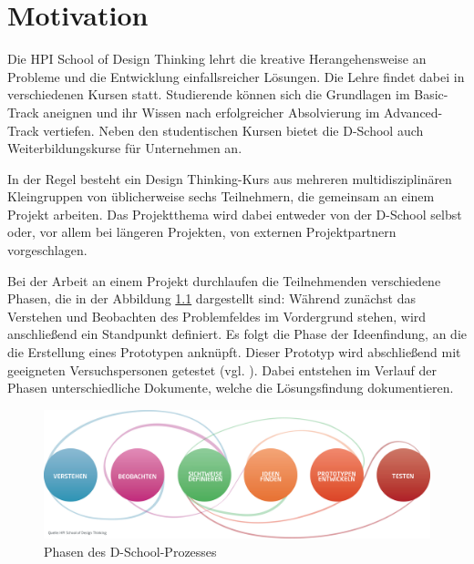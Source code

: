 \chapter{Motivation}
\label{chap:Einleitung}
Die HPI School of Design Thinking lehrt die kreative Herangehensweise an Probleme und die Entwicklung einfallsreicher Lösungen. Die Lehre findet dabei in verschiedenen Kursen statt. Studierende können sich die Grundlagen im \gls{Basic-Track} aneignen und ihr Wissen nach erfolgreicher Absolvierung im  \gls{Advanced-Track} vertiefen. Neben den studentischen Kursen bietet die D-School auch Weiterbildungskurse für Unternehmen an.

In der Regel besteht ein Design Thinking-Kurs aus mehreren multidisziplinären Kleingruppen von üblicherweise sechs Teilnehmern, die gemeinsam an einem Projekt arbeiten. Das Projektthema wird dabei entweder von der D-School selbst oder, vor allem bei längeren Projekten, von externen Projektpartnern vorgeschlagen. 

Bei der Arbeit an einem Projekt durchlaufen die Teilnehmenden verschiedene Phasen, die in der Abbildung \ref{fig:dschool-prozess} dargestellt sind: Während zunächst das Verstehen und Beobachten des Problemfeldes im Vordergrund stehen, wird anschließend ein Standpunkt definiert. Es folgt die Phase der Ideenfindung, an die die Erstellung eines Prototypen anknüpft. Dieser Prototyp wird abschließend mit geeigneten Versuchspersonen getestet (vgl. \cite{design-thinking}). Dabei entstehen im Verlauf der Phasen unterschiedliche Dokumente, welche die Lösungsfindung dokumentieren.

\begin{figure}[ht]  
  \centering     
  \includegraphics[width=1.0\textwidth]{img/dschool_prozess.jpg}  
   \caption{Phasen des D-School-Prozesses\protect\footnotemark}
  \label{fig:dschool-prozess} 
\end{figure}

